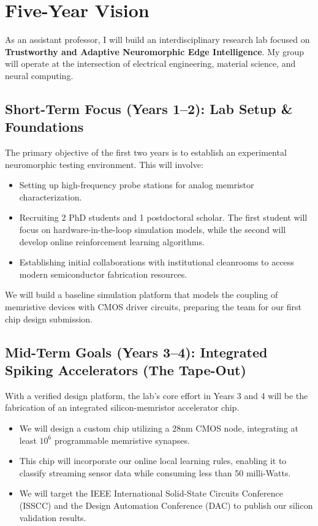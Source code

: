 \section{Five-Year Vision}

As an assistant professor, I will build an interdisciplinary research lab focused on \textbf{Trustworthy and Adaptive Neuromorphic Edge Intelligence}. My group will operate at the intersection of electrical engineering, material science, and neural computing.

\subsection{Short-Term Focus (Years 1--2): Lab Setup \& Foundations}
The primary objective of the first two years is to establish an experimental neuromorphic testing environment. This will involve:
\begin{itemize}
    \item Setting up high-frequency probe stations for analog memristor characterization.
    \item Recruiting 2 PhD students and 1 postdoctoral scholar. The first student will focus on hardware-in-the-loop simulation models, while the second will develop online reinforcement learning algorithms.
    \item Establishing initial collaborations with institutional cleanrooms to access modern semiconductor fabrication resources.
\end{itemize}
We will build a baseline simulation platform that models the coupling of memristive devices with CMOS driver circuits, preparing the team for our first chip design submission.

\subsection{Mid-Term Goals (Years 3--4): Integrated Spiking Accelerators (The Tape-Out)}
With a verified design platform, the lab's core effort in Years 3 and 4 will be the fabrication of an integrated silicon-memristor accelerator chip. 
\begin{itemize}
    \item We will design a custom chip utilizing a 28nm CMOS node, integrating at least $10^6$ programmable memristive synapses.
    \item This chip will incorporate our online local learning rules, enabling it to classify streaming sensor data while consuming less than 50 milli-Watts.
    \item We will target the IEEE International Solid-State Circuits Conference (ISSCC) and the Design Automation Conference (DAC) to publish our silicon validation results.
\end{itemize}

